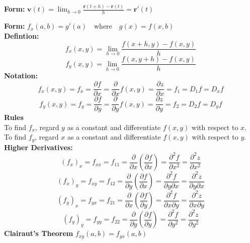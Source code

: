 \documentclass[2pt]{article}
\begin{document}
\begin{multicols}{2}
\begin{tcolorbox}[title=\textbf{Motion in space}, colframe=lightblue]
    \textbf{Form:} 	$ \mathbf{v}(t) = \lim_{{h \to 0}} \frac{\mathbf{r}(t + h) - \mathbf{r}(t)}{h} = \mathbf{r}'(t) $ 
\end{tcolorbox}

\begin{tcolorbox}[title=\textbf{Partial Derivatives}, colframe=lightblue]
    \textbf{Form:} 	$ f_x(a, b) = g'(a) \quad \text{where} \quad g(x) = f(x, b) $ \\
    \textbf{Defintion:} 
    \[f_x(x, y) = \lim_{{h \to 0}} \frac{f(x + h, y) - f(x, y)}{h}\]
    \[f_y(x, y) = \lim_{{h \to 0}} \frac{f(x, y + h) - f(x, y)}{h}\]
    \textbf{Notation:} 
    \[ f_x(x, y) = f_x = \frac{\partial f}{\partial x} = \frac{\partial}{\partial x} f(x, y) = \frac{\partial z}{\partial x} = f_1 = D_1 f = D_x f \]
    \[ f_y(x, y) = f_y = \frac{\partial f}{\partial y} = \frac{\partial}{\partial y} f(x, y) = \frac{\partial z}{\partial y} = f_2 = D_2 f = D_y f \]
    \textbf{Rules} \\
    To find $f_x$, regard $y$ as a constant and differentiate $f(x, y)$ with respect to $x$.\\
    To find $f_y$, regard $x$ as a constant and differentiate $f(x, y)$ with respect to $y$. \\
    \textbf{Higher Derivatives:}
    \[(f_x)_x = f_{xx} = f_{11} = \frac{\partial}{\partial x} \left( \frac{\partial f}{\partial x} \right) = \frac{\partial^2 f}{\partial x^2} = \frac{\partial^2 z}{\partial x^2}\]
    \[(f_x)_y = f_{xy} = f_{12} = \frac{\partial}{\partial y} \left( \frac{\partial f}{\partial x} \right) = \frac{\partial^2 f}{\partial y \partial x} = \frac{\partial^2 z}{\partial y \partial x} \]
    \[ (f_y)_x = f_{yx} = f_{21} = \frac{\partial}{\partial x} \left( \frac{\partial f}{\partial y} \right) = \frac{\partial^2 f}{\partial x \partial y} = \frac{\partial^2 z}{\partial x \partial y} \]
    \[(f_y)_y = f_{yy} = f_{22} = \frac{\partial}{\partial y} \left( \frac{\partial f}{\partial y} \right) = \frac{\partial^2 f}{\partial y^2} = \frac{\partial^2 z}{\partial y^2} \]
    \textbf{Clairaut's Theorem} $ f_{xy}(a, b) = f_{yx}(a, b) $
\end{tcolorbox}


\end{multicols}
\end{document}
